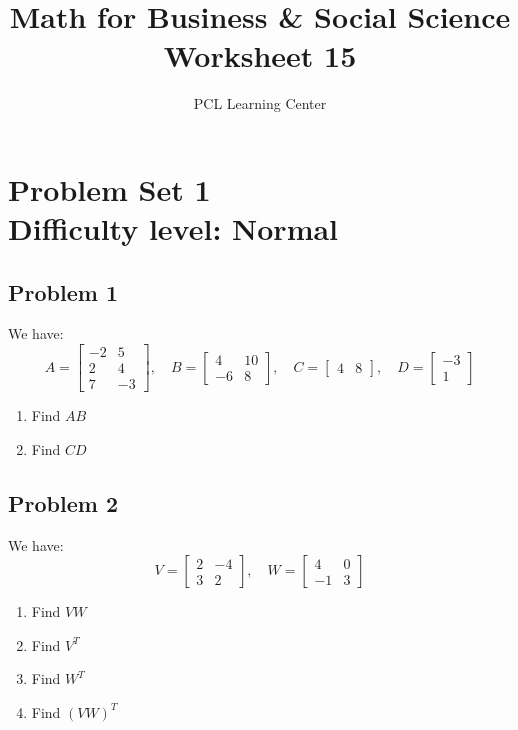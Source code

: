 \documentclass[12pt]{article}
\title{Math for Business \& Social Science\\ Worksheet 15}
\author{PCL Learning Center}
\date{}
\begin{document}
\maketitle

\section*{Problem Set 1\\Difficulty level: Normal}
\subsection*{Problem 1}
We have: 
\[
A = \begin{bmatrix}
-2 & 5 \\
2 & 4 \\
7 & -3 
\end{bmatrix}, \quad 
B = \begin{bmatrix}
4 & 10 \\
-6 & 8 
\end{bmatrix}, \quad 
C = \begin{bmatrix}
4 & 8
\end{bmatrix}, \quad 
D = \begin{bmatrix}
-3 \\
1
\end{bmatrix}
\]

\begin{enumerate}[label=\alph*.]
    \item Find \( AB \)
    \item Find \( CD \)
\end{enumerate}

\subsection*{Problem 2}
We have: 
\[
V = \begin{bmatrix}
2 & -4 \\
3 & 2 
\end{bmatrix}, \quad 
W = \begin{bmatrix}
4 & 0 \\
-1 & 3 
\end{bmatrix}
\]

\begin{enumerate}[label=\alph*.]
    \item Find \( VW \)
    \item Find \( V^T \)
    \item Find \( W^T \)
    \item Find \( (VW)^T \)
\end{enumerate}
\end{document}
